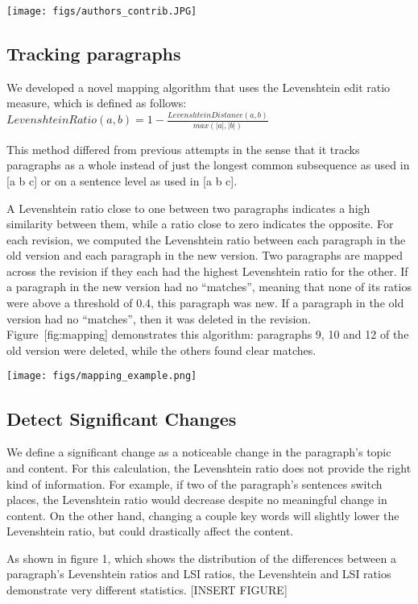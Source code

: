 \texttt{[image: figs/authors\_contrib.JPG]}\\

\subsection{Tracking paragraphs}\label{tracking-paragraphs}

We developed a novel mapping algorithm that uses the Levenshtein edit
ratio measure, which is defined as follows:
\(Levenshtein Ratio(a,b) = 1-\frac{Levenshtein Distance(a,b)}{max(|a|,|b|)} \)

This method differed from previous attempts in the sense that it tracks
paragraphs as a whole instead of just the longest common subsequence as
used in {[}a b c{]} or on a sentence level as used in {[}a b c{]}.

A Levenshtein ratio close to one between two paragraphs indicates a high
similarity between them, while a ratio close to zero indicates the
opposite. For each revision, we computed the Levenshtein ratio between
each paragraph in the old version and each paragraph in the new version.
Two paragraphs are mapped across the revision if they each had the
highest Levenshtein ratio for the other. If a paragraph in the new
version had no ``matches'', meaning that none of its ratios were above a
threshold of 0.4, this paragraph was new. If a paragraph in the old
version had no ``matches'', then it was deleted in the revision.
Figure~{[}fig:mapping{]} demonstrates this algorithm: paragraphs 9, 10
and 12 of the old version were deleted, while the others found clear
matches.

\texttt{[image: figs/mapping\_example.png]}\\

\subsection{Detect Significant
Changes}\label{detect-significant-changes}

We define a significant change as a noticeable change in the paragraph's
topic and content. For this calculation, the Levenshtein ratio does not
provide the right kind of information. For example, if two of the
paragraph's sentences switch places, the Levenshtein ratio would
decrease despite no meaningful change in content. On the other hand,
changing a couple key words will slightly lower the Levenshtein ratio,
but could drastically affect the content.

As shown in figure 1, which shows the distribution of the differences
between a paragraph's Levenshtein ratios and LSI ratios, the Levenshtein
and LSI ratios demonstrate very different statistics. {[}INSERT
FIGURE{]}

